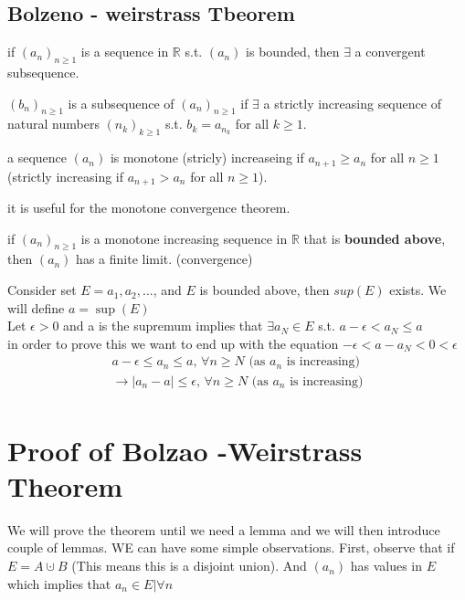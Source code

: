 \documentclass{article}
\begin{document}
\subsection{Bolzeno - weirstrass Tbeorem}
\begin{theorem} 
    
    if $(a_n)_{n \geq 1}$ is a sequence in $\mathbb{R}$ s.t. $(a_n)$ is bounded, then $\exists$ a convergent subsequence. 
\end{theorem}
\begin{definition}[Subsequence] 
    
    $(b_n)_{n \geq 1}$ is a subsequence of $(a_n)_{n \geq 1}$ if $\exists$ a strictly increasing sequence of natural numbers $(n_k)_{k \geq 1}$ s.t. $b_k = a_{n_k}$ for all $k \geq 1$.
\end{definition}
\begin{definition}
    a sequence $(a_n)$ is monotone (stricly) increaseing if $a_{n+1} \geq a_n$ for all $n \geq 1$ (strictly increasing if $a_{n+1} > a_n$ for all $n \geq 1$).

\end{definition}
it is useful for the monotone convergence theorem. 
\begin{theorem} 
    
    if $(a_n)_{n \geq 1}$ is a monotone increasing sequence in $\mathbb{R}$ that is \textbf{bounded above}, then $(a_n)$ has a finite limit. (convergence)
\end{theorem}
Consider set $E = {a_1, a_2, \dots}$, and $E$ is bounded above, then $sup(E)$ exists. We will define $a = \sup(E)$ \\
    Let $\epsilon > 0$ and a is the supremum implies that $\exists a_N \in E$ s.t. $a - \epsilon < a_N \leq a$ \\
    in order to prove this we want to end up with the equation $-\epsilon < a - a_N < 0 < \epsilon$ \\
    \begin{align*}
        a-\epsilon \leq a_n \leq a \text{,     }\forall n \geq N \text{  (as $a_n$ is increasing)}\\ 
        \rightarrow |a_n - a| \leq \epsilon \text{,     }\forall n \geq N \text{  (as $a_n$ is increasing)}\\
    \end{align*}


\section{Proof of Bolzao -Weirstrass Theorem} 
We will prove the theorem until we need a lemma and we will then introduce couple of lemmas. WE  can have some simple observations. First, observe that if $E = A \cupdot B$ (This means this is a disjoint union). And $(a_n)$ has values in $E$ which implies that $a_n \in E|  \forall n$ 
\end{document}

